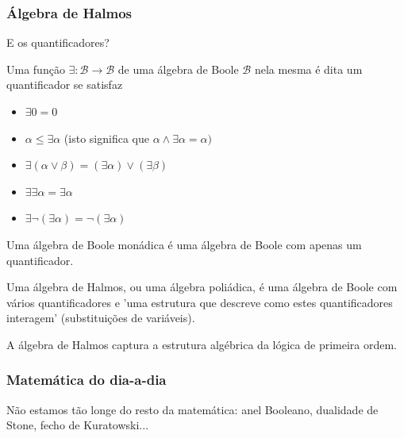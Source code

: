 \begin{frame}{}
\frametitle{Álgebra de Halmos}
E os quantificadores?\\ \pause

Uma função $\exists: \mathcal{B} \rightarrow \mathcal{B}$ de uma álgebra de Boole $\mathcal{B}$ nela mesma é dita um quantificador se satisfaz \pause
\begin{itemize}
\item $\exists 0 = 0 $ \pause
\item $\alpha \leq \exists \alpha$ (isto significa que $\alpha \wedge \exists \alpha = \alpha)$ \pause
\item $\exists (\alpha \vee \beta) = (\exists \alpha) \vee (\exists \beta)$ \pause
\item $\exists \exists \alpha = \exists \alpha$ \pause
\item $\exists \lnot (\exists \alpha) = \lnot(\exists \alpha)$ \pause
\end{itemize}

Uma álgebra de Boole monádica é uma álgebra de Boole com apenas um quantificador. \\ \pause

Uma álgebra de Halmos, ou uma álgebra poliádica, é uma álgebra de Boole com vários quantificadores e 'uma estrutura que descreve como estes quantificadores interagem' (substituições de variáveis). \pause

A álgebra de Halmos captura a estrutura algébrica da lógica de primeira ordem.
\end{frame}

\begin{frame}{}
\frametitle{Matemática do dia-a-dia}

Não estamos tão longe do resto da matemática: anel Booleano, dualidade de Stone, fecho de Kuratowski... 
\end{frame}

